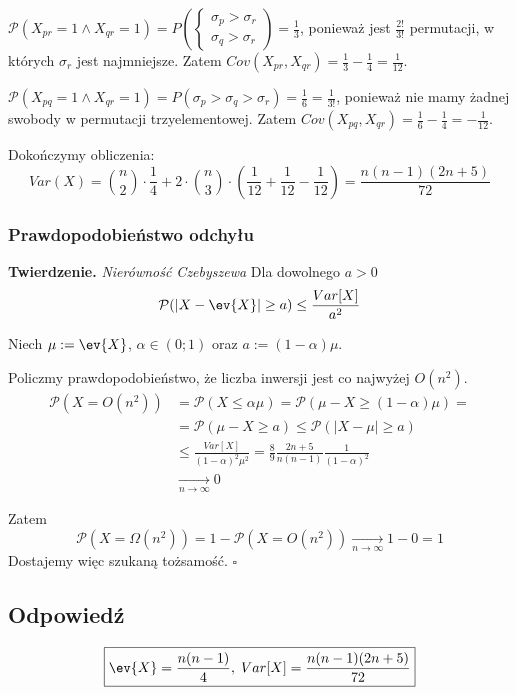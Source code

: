 \(\mathcal{P}(X_{pr} = 1 \land X_{qr} = 1) = P\left(\left\{\substack{\sigma_p > \sigma_r\\ \sigma_q > \sigma_r} \right. \right) = \frac{1}{3}\), ponieważ jest \(\frac{2!}{3!}\) permutacji, w których \(\sigma_r\) jest najmniejsze. Zatem \(Cov(X_{pr}, X_{qr}) = \frac{1}{3} - \frac{1}{4} = \frac{1}{12}\).

\(\mathcal{P}(X_{pq} = 1 \land X_{qr} = 1) = P\left(\sigma_p > \sigma_q > \sigma_r \right) = \frac{1}{6} = \frac{1}{3!}\), ponieważ nie mamy żadnej swobody w permutacji trzyelementowej. Zatem \(Cov(X_{pq}, X_{qr}) = \frac{1}{6} - \frac{1}{4} = -\frac{1}{12}\).

Dokończymy obliczenia:
\[
	Var(X) = \binom{n}{2} \cdot \frac{1}{4} + 2 \cdot \binom{n}{3} \cdot \left(\frac{1}{12} + \frac{1}{12} - \frac{1}{12}\right) = \frac{n(n-1)(2n+5)}{72}
\]

\subsubsection*{Prawdopodobieństwo odchyłu}
\textbf{Twierdzenie.} \textit{Nierówność Czebyszewa} Dla dowolnego \(a > 0\)
\[
	\mathcal{P}(|X - \ev{X}| \ge a) \le \frac{Var[X]}{a^2}
\]

Niech \(\mu := \ev{X}\), \(\alpha \in (0; 1)\) oraz \(a := (1 - \alpha)\mu\).

Policzmy prawdopodobieństwo, że liczba inwersji jest co najwyżej \(O(n^2)\).
\begin{align*}
	\mathcal{P}(X = O(n^2)) & = \mathcal{P}(X \le \alpha \mu) = \mathcal{P}(\mu - X \ge (1 - \alpha) \mu) =                 \\
	                        & = \mathcal{P}(\mu - X \ge a) \le \mathcal{P}(\left|X - \mu\right| \ge a)                      \\
	                        & \le \frac{Var[X]}{(1-\alpha)^2\mu^2} = \frac{8}{9} \frac{2n+5}{n(n-1)} \frac{1}{(1-\alpha)^2} \\
	                        & \xrightarrow[n\to\infty]{} 0
\end{align*}

Zatem
\[
	\mathcal{P}(X = \Omega(n^2)) = 1 - \mathcal{P}(X = O(n^2)) \xrightarrow[n\to\infty]{} 1 - 0 = 1
\]
Dostajemy więc szukaną tożsamość. \(\square\)

\subsection*{Odpowiedź}
\[
	\boxed{\ev{X} = \frac{n(n-1)}{4}, \; Var[X] = \frac{n(n-1)(2n+5)}{72}}
\]
